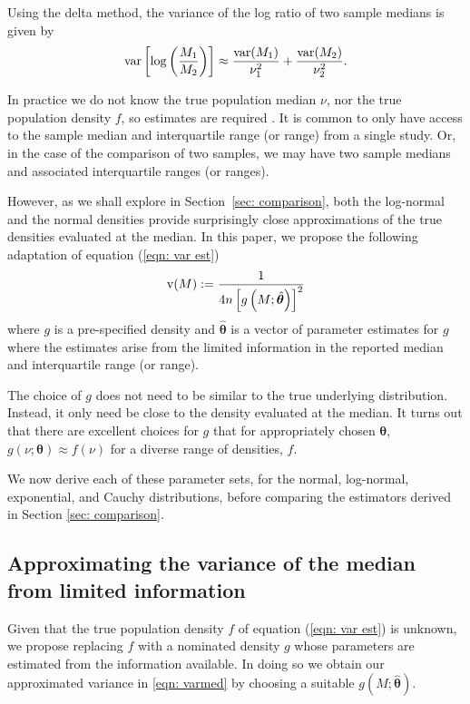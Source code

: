 \documentclass{article}
\begin{document}
Using the delta method, the variance of the log ratio of two sample medians is given by
\begin{equation}\label{eqn: var lr}
\operatorname{var}\left[\log\left(\frac {M_1}{M_2 }\right)\right] \approx  \frac{\operatorname{var}(M_1)}{\nu_1^2}+ \frac{\operatorname{var}(M_2)} {\nu_2^2}.
\end{equation}

In practice we do not know the true population median $\nu$, nor the true population density $f$, so estimates are required . It is common to only have access to the sample median and interquartile range (or range) from a single study. Or, in the case of the comparison of two samples, we may have two sample medians and associated interquartile ranges (or ranges).

However, as we shall explore in Section~\ref{sec: comparison}, both the log-normal and the normal densities provide surprisingly close approximations of the true densities evaluated at the median.  In this paper, we propose the following adaptation of equation (\ref{eqn: var est})
\begin{equation} \label{eqn: varmed}
\operatorname{v}(M) := \frac 1 {4n\left[ g\left(M; \hat{\bm \theta}\right)\right]^2}
\end{equation}
where $g$ is a pre-specified density and $\hat{\bm \theta}$ is a vector of parameter estimates for $g$ where the estimates arise from the limited information in the reported median and interquartile range (or range).

\begin{remark}
The choice of $g$ does not need to be similar to the true underlying distribution.  Instead, it only need be close to the density evaluated at the median. It turns out that there are excellent choices for $g$ that for appropriately chosen $\bm{\theta}$, $g(\nu;\bm \theta)\approx f(\nu)$ for a diverse range of densities, $f$.
\end{remark}

We now derive each of these parameter sets, for the normal, log-normal, exponential, and Cauchy distributions, before comparing the estimators derived in Section \ref{sec: comparison}.

\subsection{Approximating the variance of the median from limited information}

Given that the true population density $f$ of equation (\ref{eqn: var est}) is unknown, we propose replacing $f$ with a nominated density $g$ whose parameters are estimated from the information available.  In doing so we obtain our approximated variance in \eqref{eqn: varmed} by choosing a suitable $g\left(M; \hat{\bm \theta}\right)$.
\end{document}
